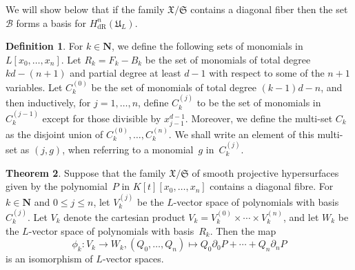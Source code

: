 \documentclass[a4paper,11pt]{article}
\numberwithin{equation}{section}
\newcommand{\NN}{\mathbf{N}} %
\renewcommand{\to}{\rightarrow}        %
\providecommand{\HdR}{H_{\text{dR}}}    %
\providecommand{\cB}{\mathcal{B}} %
\theoremstyle{definition}
\newtheorem{thm}{Theorem}[section]
\newtheorem{defn}[thm]{Definition}
\begin{document}
We will show below that if the family $\mathfrak{X}/{\mathfrak{S}}$ contains 
a diagonal fiber then the set $\cB$ forms a basis for $\HdR^n(\mathfrak{U}_L)$.

\begin{defn} \label{defn:IndexSets}
For $k \in \NN$, we define the following sets of monomials in 
$L[x_0, \dotsc, x_n]$.  Let $R_k = F_k - B_k$ be the set of monomials of 
total degree $kd-(n+1)$ and partial degree at least $d-1$ with respect to some 
of the $n+1$ variables.  Let $C_k^{(0)}$ be the set of monomials of total 
degree $(k-1)d - n$, and then inductively, for $j = 1, \dotsc, n$, define 
$C_k^{(j)}$ to be the set of monomials in $C_k^{(j-1)}$ except for those 
divisible by $x_{j-1}^{d-1}$.  Moreover, we define the multi-set $C_k$ as 
the disjoint union of $C_k^{(0)}, \dotsc, C_k^{(n)}$.  We shall write an 
element of this multi-set as $(j, g)$, when referring to a monomial~$g$ 
in~$C_k^{(j)}$.
\end{defn}

\begin{thm} \label{thm:Isomorphism}
Suppose that the family $\mathfrak{X}/\mathfrak{S}$ of smooth projective
hypersurfaces given by the polynomial~$P$ in $K[t][x_0, \dotsc, x_n]$ contains 
a diagonal fibre.  For $k \in \NN$ and $0 \leq j \leq n$, let $V_k^{(j)}$ be 
the $L$-vector space of polynomials with basis $C_k^{(j)}$. Let $V_k$ denote 
the cartesian product $V_k = V_k^{(0)} \times \dotsb \times V_k^{(n)}$, and 
let $W_k$ be the $L$-vector space of polynomials with basis~$R_k$. 
Then the map 
\begin{equation}
\phi_k \colon V_k \to W_k, 
(Q_0, \dotsc, Q_n) \mapsto Q_0 \partial_0 P + \dotsb + Q_n \partial_n P
\end{equation}
is an isomorphism of $L$-vector spaces.
\end{thm}
\end{document}
